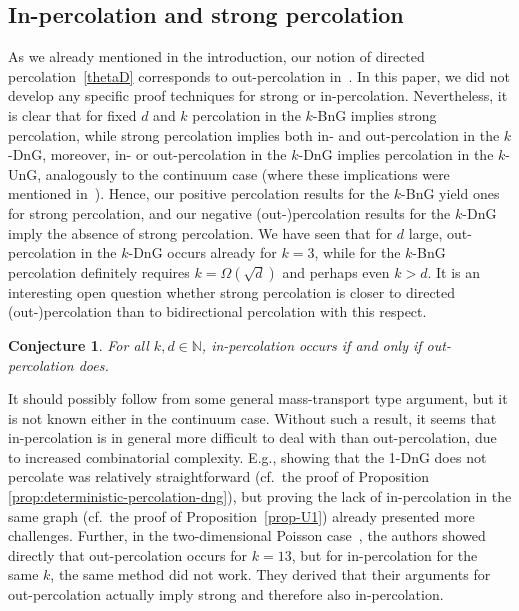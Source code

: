 \documentclass[a4paper, oneside, 11pt]{amsart}
\newcommand{\N}{\mathbb{N}}
\newtheorem{conj}[theorem]{Conjecture}
\theoremstyle{definition}
\newcommand{\1}{\mathbbm{1}}
\newcommand{\0}{\mathbf{o}}
\numberwithin{equation}{section}
\begin{document}
\subsection{In-percolation and strong percolation}\label{sec-instrong}
As we already mentioned in the introduction, our notion of directed percolation~\eqref{thetaD} corresponds to out-percolation in~\cite{BalisterBollobas13}. 
In this paper, we did not develop any specific proof techniques for strong or in-percolation. Nevertheless, it is clear that for fixed $d$ and $k$ percolation in the $k$-BnG implies strong percolation, while strong percolation implies both in- and out-percolation in the $k$-DnG, moreover, in- or out-percolation in the $k$-DnG implies percolation in the $k$-UnG, analogously to the continuum case (where these implications were mentioned in~\cite{BalisterBollobas13}). Hence, our positive percolation results for the $k$-BnG yield ones for strong percolation, and our negative (out-)percolation results for the $k$-DnG imply the absence of strong percolation.
We have seen that for $d$ large, out-percolation in the $k$-DnG occurs already for $k=3$, while for the $k$-BnG percolation definitely requires $k=\Omega(\sqrt d)$ and perhaps even $k>d$. It is an interesting open question whether strong percolation is closer to directed (out-)percolation than to bidirectional percolation with this respect.

\begin{conj}
    For all $k,d \in \N$, in-percolation occurs if and only if out-percolation does. 
\end{conj}

It should possibly follow from some general mass-transport type argument, but it is not known either in the continuum case. Without such a result, it seems that in-percolation is in general more difficult to deal with than out-percolation, due to increased combinatorial complexity. E.g., showing that the 1-DnG does not percolate was relatively straightforward (cf.\ the proof of Proposition \ref{prop:deterministic-percolation-dng}), but proving the lack of in-percolation in the same graph (cf.\ the proof of Proposition~\ref{prop-U1}) already presented more challenges. Further, in the two-dimensional Poisson case~\cite[Proof of Theorem 2]{BalisterBollobas13}, the authors showed directly that 
out-percolation occurs for $k=13$, but for in-percolation for the same $k$, the same method did not work. 
They derived that their arguments for out-percolation actually imply strong and therefore also in-percolation.
\end{document}
